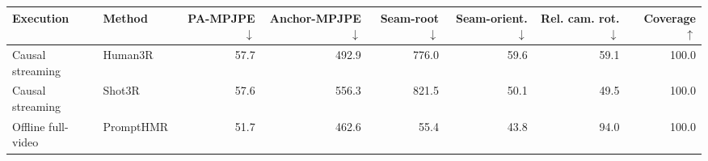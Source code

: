 \begin{tabular}{llrrrrrr}
\toprule
Execution & Method & PA-MPJPE $\downarrow$ & Anchor-MPJPE $\downarrow$ & Seam-root $\downarrow$ & Seam-orient. $\downarrow$ & Rel. cam. rot. $\downarrow$ & Coverage $\uparrow$ \\
\midrule
Causal streaming & Human3R & 57.7 & 492.9 & 776.0 & 59.6 & 59.1 & 100.0 \\
Causal streaming & Shot3R & 57.6 & 556.3 & 821.5 & 50.1 & 49.5 & 100.0 \\
\midrule
Offline full-video & PromptHMR & 51.7 & 462.6 & 55.4 & 43.8 & 94.0 & 100.0 \\
\bottomrule
\end{tabular}

